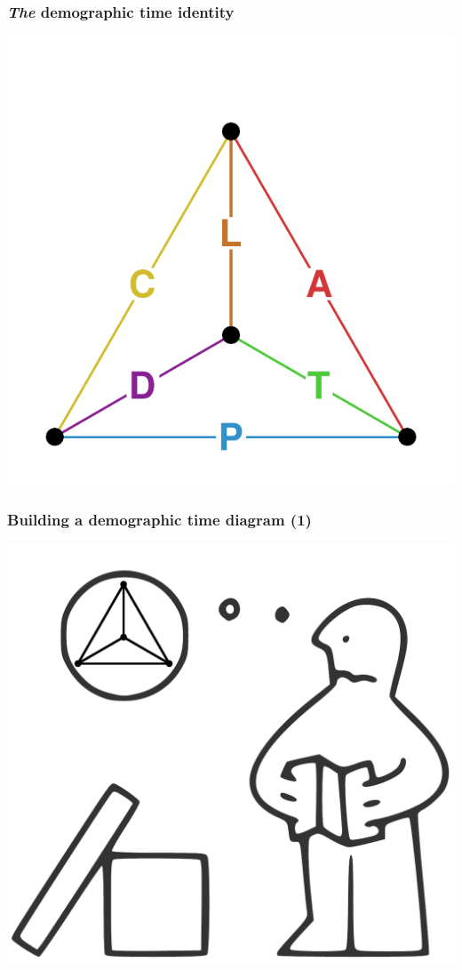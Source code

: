 \documentclass[20pt]{beamer}
\begin{document}
\begin{frame}
\frametitle{\textit{The} demographic time identity}
\vspace{-4em}
\begin{center}
\includegraphics[scale=1.7]{Figures/TetraHedronEdgesOnly.pdf}
\end{center}
\end{frame}


\begin{frame}
\frametitle{Building a demographic time diagram (1)}
\vspace{-3em}
\begin{center}
\includegraphics[scale=.8]{Figures/IkeaBuild.pdf}
\end{center}
\end{frame}
\end{document}
